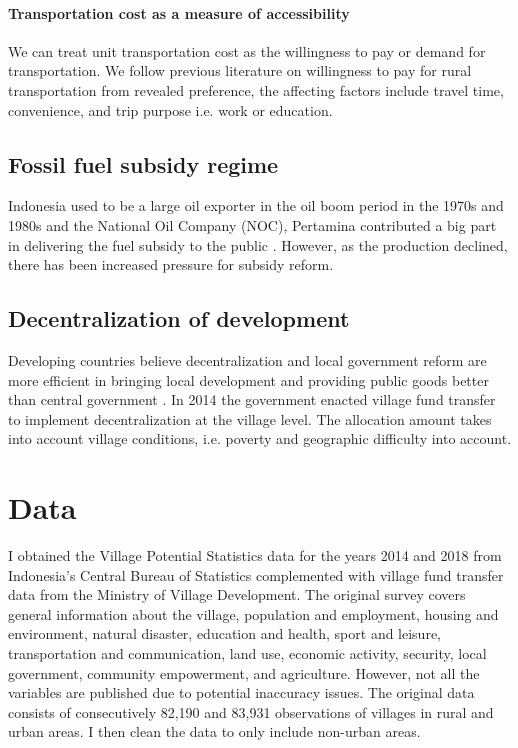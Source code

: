 \documentclass[letterpaper,12pt,leqno]{article}
\begin{document}
\paragraph{Transportation cost as a measure of accessibility} We can treat unit transportation cost as the willingness to pay or demand for transportation. We follow previous literature on willingness to pay for rural transportation from revealed preference, the affecting factors include travel time, convenience, and trip purpose i.e. work or education.



\subsection{Fossil fuel subsidy regime}

Indonesia used to be a large oil exporter in the oil boom period in the 1970s and 1980s and the National Oil Company (NOC), Pertamina contributed a big part in delivering the fuel subsidy to the public \citep{ichsan_2022}. However, as the production declined, there has been increased pressure for subsidy reform. 

\subsection{Decentralization of development}

Developing countries believe decentralization and local government reform are more efficient in bringing local development \citep{vazquez_2017} and providing public goods better than central government \citep{arends2020}. In 2014 the government enacted village fund transfer to implement decentralization at the village level. The allocation amount takes into account village conditions, i.e. poverty and geographic difficulty into account.

\section{Data}\label{s:data}

I obtained the Village Potential Statistics data for the years 2014 and 2018 from Indonesia's Central Bureau of Statistics complemented with village fund transfer data from the Ministry of Village Development. The original survey covers general information about the village, population and employment, housing and environment, natural disaster, education and health, sport and leisure, transportation and communication, land use, economic activity, security, local government, community empowerment, and agriculture. However, not all the variables are published due to potential inaccuracy issues. The original data consists of consecutively 82,190 and 83,931 observations of villages in rural and urban areas. I then clean the data to only include non-urban areas.
\end{document}
